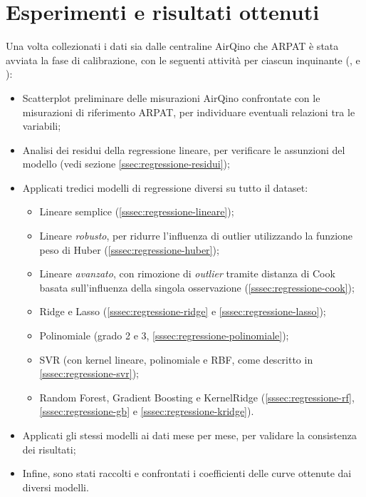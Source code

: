 \clearpage
\section{Esperimenti e risultati ottenuti}\label{sec:esperimenti}
Una volta collezionati i dati sia dalle centraline AirQino che ARPAT è stata avviata la fase di calibrazione, con le seguenti attività per ciascun inquinante (,  e ):

\begin{itemize}
  \item Scatterplot preliminare delle misurazioni AirQino confrontate con le misurazioni di riferimento ARPAT, per individuare eventuali relazioni tra le variabili;
  \item Analisi dei residui della regressione lineare, per verificare le assunzioni del modello (vedi sezione \ref{ssec:regressione-residui});
  \item Applicati tredici modelli di regressione diversi su tutto il dataset:
        \begin{itemize}
          \item Lineare semplice (\ref{sssec:regressione-lineare});
          \item Lineare \textit{robusto}, per ridurre l'influenza di outlier utilizzando la funzione peso di Huber (\ref{sssec:regressione-huber});
          \item Lineare \textit{avanzato}, con rimozione di \textit{outlier} tramite distanza di Cook basata sull'influenza della singola osservazione (\ref{sssec:regressione-cook});
          \item Ridge e Lasso (\ref{sssec:regressione-ridge} e \ref{sssec:regressione-lasso});
          \item Polinomiale (grado 2 e 3, \ref{sssec:regressione-polinomiale});
          \item SVR (con kernel lineare, polinomiale e RBF, come descritto in \ref{sssec:regressione-svr});
          \item Random Forest, Gradient Boosting e KernelRidge (\ref{sssec:regressione-rf}, \ref{sssec:regressione-gb} e \ref{sssec:regressione-kridge}).
        \end{itemize}
    \item Applicati gli stessi modelli ai dati mese per mese, per validare la consistenza dei risultati;
    \item Infine, sono stati raccolti e confrontati i coefficienti delle curve ottenute dai diversi modelli.
\end{itemize}

